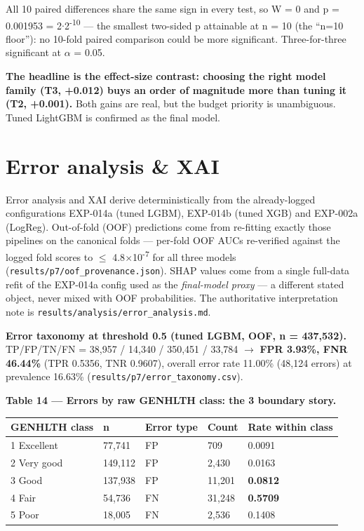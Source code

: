 \documentclass[11pt,a4paper]{article}
\begin{document}
All 10 paired differences share the same sign in every test, so W = 0
and p = 0.001953 = 2$\cdot$2\textsuperscript{-}\textsuperscript{1}\textsuperscript{0} --- the smallest two-sided p attainable at n =
10 (the ``n=10 floor''): no 10-fold paired comparison could be more
significant. Three-for-three significant at $\alpha$ = 0.05.

\textbf{The headline is the effect-size contrast: choosing the right
model family (T3, +0.012) buys an order of magnitude more than tuning it
(T2, +0.001).} Both gains are real, but the budget priority is
unambiguous. Tuned LightGBM is confirmed as the final model.

\section{Error analysis \& XAI}\label{error-analysis-xai}

Error analysis and XAI derive deterministically from the already-logged
configurations EXP-014a (tuned LGBM), EXP-014b (tuned XGB) and EXP-002a
(LogReg). Out-of-fold (OOF) predictions come from re-fitting exactly
those pipelines on the canonical folds --- per-fold OOF AUCs re-verified
against the logged fold scores to $\le$ 4.8$\times$10\textsuperscript{-}\textsuperscript{7} for all three models
(\texttt{results/p7/oof\_provenance.json}). SHAP values come from a
single full-data refit of the EXP-014a config used as the
\emph{final-model proxy} --- a different stated object, never mixed with
OOF probabilities. The authoritative interpretation note is
\texttt{results/analysis/error\_analysis.md}.

\textbf{Error taxonomy at threshold 0.5 (tuned LGBM, OOF, n = 437,532).}
TP/FP/TN/FN = 38,957 / 14,340 / 350,451 / 33,784 $\rightarrow$ \textbf{FPR 3.93\%,
FNR 46.44\%} (TPR 0.5356, TNR 0.9607), overall error rate 11.00\%
(48,124 errors) at prevalence 16.63\%
(\texttt{results/p7/error\_taxonomy.csv}).

\textbf{Table 14 --- Errors by raw GENHLTH class: the 3
boundary story.}

{\def\LTcaptype{none} %

\begin{center}\small
\begin{tabular}{@{}lllll@{}}
\toprule\noalign{}
GENHLTH class & n & Error type & Count & Rate within class \\
\midrule\noalign{}
1 Excellent & 77,741 & FP & 709 & 0.0091 \\
2 Very good & 149,112 & FP & 2,430 & 0.0163 \\
3 Good & 137,938 & FP & 11,201 & \textbf{0.0812} \\
4 Fair & 54,736 & FN & 31,248 & \textbf{0.5709} \\
5 Poor & 18,005 & FN & 2,536 & 0.1408 \\
\bottomrule
\end{tabular}
\end{center}

}
\end{document}
